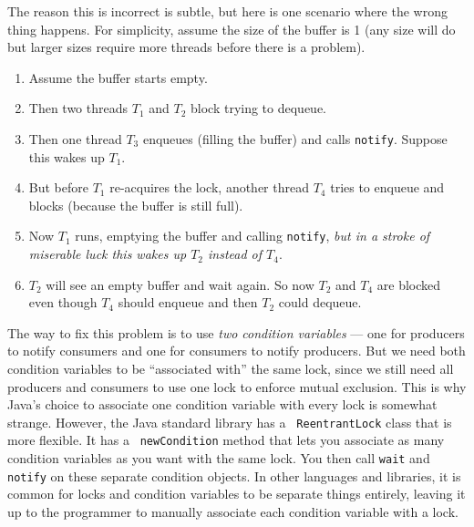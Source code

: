 \documentclass[10pt]{article}
\begin{document}
The reason this is incorrect is subtle, but here is one scenario where
the wrong thing happens.  For simplicity, assume the size of the
buffer is 1 (any size will do but larger sizes require more threads
before there is a problem).
\begin{enumerate}
\item Assume the buffer starts empty.
\item Then two threads $T_1$ and $T_2$ block trying to dequeue.
\item Then one thread $T_3$ enqueues (filling the buffer) and calls
  {\tt notify}.  Suppose this wakes up $T_1$.
\item But before $T_1$ re-acquires the lock, another thread $T_4$
  tries to enqueue and blocks (because the buffer is still full).
\item Now $T_1$ runs, emptying the buffer and calling {\tt notify},
  \emph{but in a stroke of miserable luck this wakes up $T_2$ instead
  of $T_4$}.
\item $T_2$ will see an empty buffer and wait again.  So now $T_2$ and
  $T_4$ are blocked even though $T_4$ should enqueue and then $T_2$
  could dequeue.
\end{enumerate}

The way to fix this problem is to use \emph{two condition variables}
--- one for producers to notify consumers and one for consumers to
notify producers.  But we need both condition variables to be
``associated with'' the same lock, since we still need all producers
and consumers to use one lock to enforce mutual exclusion.  This is
why Java's choice to associate one condition variable with every lock
is somewhat strange.  However, the Java standard library has a {\tt
  ReentrantLock} class that is more flexible.  It has a {\tt
  newCondition} method that lets you associate as many condition
variables as you want with the same lock.  You then call {\tt wait}
and {\tt notify} on these separate condition objects.  In other
languages and libraries, it is common for locks and condition
variables to be separate things entirely, leaving it up to the
programmer to manually associate each condition variable with a lock.
\end{document}
